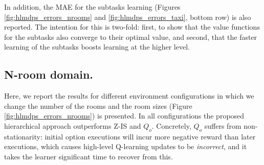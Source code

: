 In addition, the MAE for the subtasks learning (Figures \ref{fig:hlmdps_errors_nrooms} and \ref{fig:hlmdps_errors_taxi}, bottom row) is also reported. The intention for this is two-fold: first, to show that the value functions for the subtasks also converge to their optimal value, and second, that the faster learning of the subtasks boosts learning at the higher level.

\subsection{N-room domain.}
Here, we report the results for different environment configurations in which we change the number of the rooms and the room sizes (Figure \ref{fig:hlmdps_errors_nrooms}) is presented. In all configurations the proposed hierarchical approach outperforms Z-IS and $Q_o$. Concretely, $Q_o$ suffers from non-stationarity: initial option executions will incur more negative reward than later executions, which causes high-level Q-learning updates to be {\em incorrect}, and it takes the learner significant time to recover from this.

